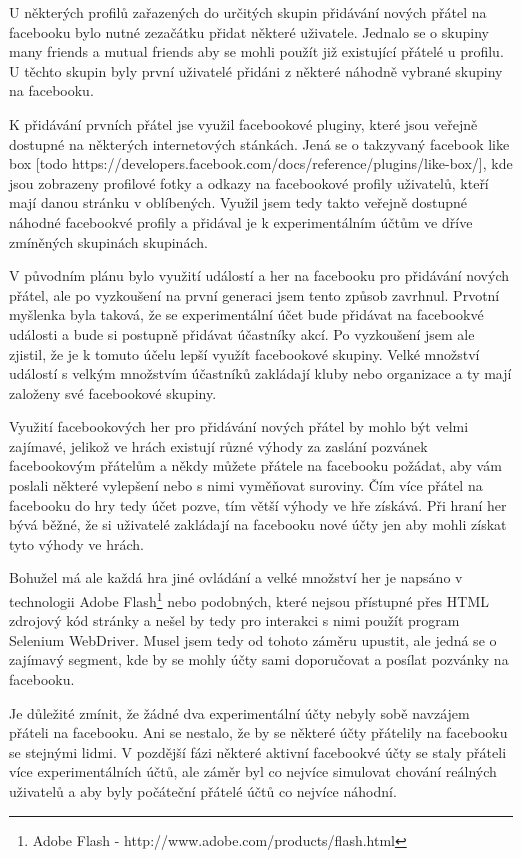 \documentclass[thesis=M,czech]{FITthesis}[2013/05/10]
\begin{document}
U některých profilů zařazených do určitých skupin přidávání nových přátel na facebooku bylo nutné zezačátku přidat některé uživatele. Jednalo se o skupiny many friends a mutual friends aby se mohli použít již existující přátelé u profilu. U těchto skupin byly první uživatelé přidáni z některé náhodně vybrané skupiny na facebooku. 

K přidávání prvních přátel jse využil facebookové pluginy, které jsou veřejně dostupné na některých internetových stánkách. Jená se o takzyvaný facebook like box [todo https://developers.facebook.com/docs/reference/plugins/like-box/], kde jsou zobrazeny profilové fotky a odkazy na facebookové profily uživatelů, kteří mají danou stránku v oblíbených. Využil jsem tedy takto veřejně dostupné náhodné facebookvé profily a přidával je k experimentálním účtům ve dříve zmíněných skupinách skupinách.

V původním plánu bylo využití událostí a her na facebooku pro přidávání nových přátel, ale po vyzkoušení na první generaci jsem tento způsob zavrhnul. Prvotní myšlenka byla taková, že se experimentální účet bude přidávat na facebookvé události a bude si postupně přidávat účastníky akcí. Po vyzkoušení jsem ale zjistil, že je k tomuto účelu lepší využít facebookové skupiny. Velké množství událostí s velkým množstvím účastníků zakládají kluby nebo organizace a ty mají založeny své facebookové skupiny.

Využití facebookových her pro přidávání nových přátel by mohlo být velmi zajímavé, jelikož ve hrách existují různé výhody za zaslání pozvánek facebookovým přátelům a někdy můžete přátele na facebooku požádat, aby vám poslali některé vylepšení nebo s nimi vyměňovat suroviny. Čím více přátel na facebooku do hry tedy účet pozve, tím větší výhody ve hře získává. Při hraní her bývá běžné, že si uživatelé zakládají na facebooku nové účty jen aby mohli získat tyto výhody ve hrách.

Bohužel má ale každá hra jiné ovládání a velké množství her je napsáno v technologii Adobe Flash\footnote{Adobe Flash - http://www.adobe.com/products/flash.html} nebo podobných, které nejsou přístupné přes HTML zdrojový kód stránky a nešel by tedy pro interakci s nimi použít program Selenium WebDriver. Musel jsem tedy od tohoto záměru upustit, ale jedná se o zajímavý segment, kde by se mohly účty sami doporučovat a posílat pozvánky na facebooku.

Je důležité zmínit, že žádné dva experimentální účty nebyly sobě navzájem přáteli na facebooku. Ani se nestalo, že by se některé účty přátelily na facebooku se stejnými lidmi. V pozdější fázi některé aktivní facebookvé účty se staly přáteli více experimentálních účtů, ale záměr byl co nejvíce simulovat chování reálných uživatelů a aby byly počáteční přátelé účtů co nejvíce náhodní.
\end{document}
